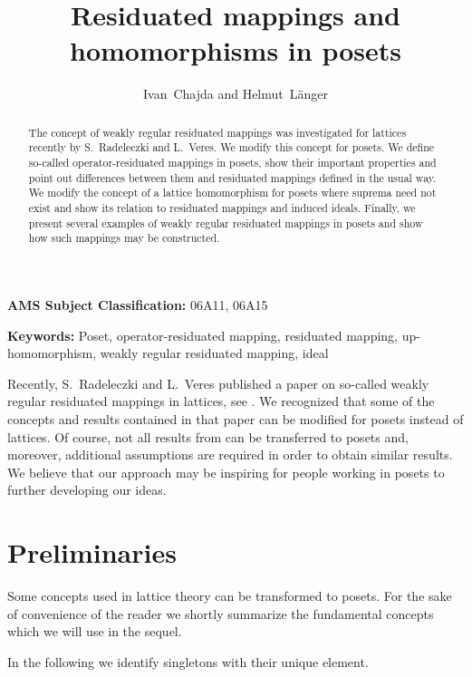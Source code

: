 \documentclass[12pt]{article}
\title{Residuated mappings and homomorphisms in posets}
\author{Ivan~Chajda and Helmut~L\"anger}
\date{}
\begin{document}
	

\maketitle
	
\begin{abstract}
The concept of weakly regular residuated mappings was investigated for lattices recently by S.~Radeleczki and L.~Veres. We modify this concept for posets. We define so-called operator-residuated mappings in posets, show their important properties and point out differences between them and residuated mappings defined in the usual way. We modify the concept of a lattice homomorphism for posets where suprema need not exist and show its relation to residuated mappings and induced ideals. Finally, we present several examples of weakly regular residuated mappings in posets and show how such mappings may be constructed.
\end{abstract}

{\bf AMS Subject Classification:} 06A11, 06A15

{\bf Keywords:} Poset, operator-residuated mapping, residuated mapping, up-homomorphism, weakly regular residuated mapping, ideal

Recently, S.~Radeleczki and L.~Veres published a paper on so-called weakly regular residuated mappings in lattices, see \cite{RV}. We recognized that some of the concepts and results contained in that paper can be modified for posets instead of lattices. Of course, not all results from \cite{RV} can be transferred to posets and, moreover, additional assumptions are required in order to obtain similar results. We believe that our approach may be inspiring for people working in posets to further developing our ideas.

\section{Preliminaries}

Some concepts used in lattice theory can be transformed to posets. For the sake of convenience of the reader we shortly summarize the fundamental concepts which we will use in the sequel.

In the following we identify singletons with their unique element.
\end{document}
